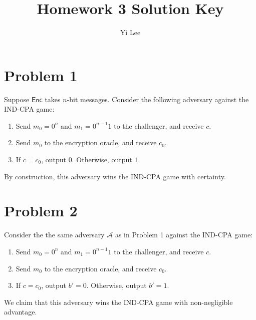 \documentclass{article}
\title{Homework 3 Solution Key}
\author{Yi Lee}
\theoremstyle{definition}
\begin{document}


\maketitle

\section*{Problem 1}

Suppose $\mathsf{Enc}$ takes $n$-bit messages.
Consider the following adversary against the IND-CPA game:
\begin{enumerate}
    \item Send $m_0=0^n$ and $m_1=0^{n-1}1$ to the challenger, and receive $c$.
    \item Send $m_0$ to the encryption oracle, and receive $c_0$.
    \item If $c=c_0$, output $0$. Otherwise, output $1$.
\end{enumerate}
By construction, this adversary wins the IND-CPA game with certainty.

\section*{Problem 2}

Consider the the same adversary $\mathcal{A}$ as in Problem 1 against the IND-CPA game:
\begin{enumerate}
    \item Send $m_0=0^n$ and $m_1=0^{n-1}1$ to the challenger, and receive $c$.
    \item Send $m_0$ to the encryption oracle, and receive $c_0$.
    \item If $c=c_0$, output $b'=0$. Otherwise, output $b'=1$.
\end{enumerate}
We claim that this adversary wins the IND-CPA game with non-negligible advantage.
\end{document}
